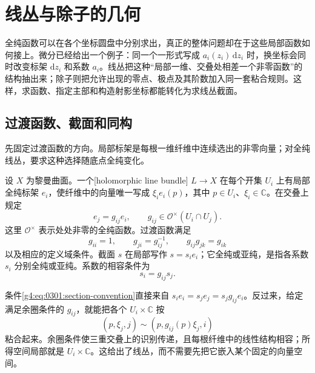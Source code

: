 
% 
% 

\section{线丛与除子的几何}
\label{g4:sec:0301}

全纯函数可以在各个坐标圆盘中分别求出，真正的整体问题却在于这些局部函数如何接上。微分已经给出一个例子：同一个一形式写成 \(a_i(z_i)\,\mathrm{d}z_i\) 时，换坐标会同时改变标架 \(\mathrm{d}z_i\) 和系数 \(a_i\)。线丛把这种“局部一维、交叠处相差一个非零函数”的结构抽出来；除子则把允许出现的零点、极点及其阶数加入同一套粘合规则。这样，求函数、指定主部和构造射影坐标都能转化为求线丛截面。

\subsection{过渡函数、截面和同构}
\label{g4:subsec:0301:01}

先固定过渡函数的方向。局部标架是每根一维纤维中连续选出的非零向量；对全纯线丛，要求这种选择随底点全纯变化。

\begin{definition}\label{g4:def:0301:line-bundle}
	设 \(X\) 为黎曼曲面。一个[holomorphic line bundle] \(L\to X\) 在每个开集 \(U_i\) 上有局部全纯标架 \(e_i\)，使纤维中的向量唯一写成 \(\xi_i e_i(p)\)，其中 \(p\in U_i\)、\(\xi_i\in\mathbb C\)。在交叠上规定
	\begin{equation}\label{g4:eq:0301:transition-convention}
		e_j=g_{ij}e_i,\qquad
		g_{ij}\in\mathcal O^\times(U_i\cap U_j).
	\end{equation}
	这里 \(\mathcal O^\times\) 表示处处非零的全纯函数。过渡函数满足
	\[
		g_{ii}=1,\qquad g_{ji}=g_{ij}^{-1},\qquad
		g_{ij}g_{jk}=g_{ik}
	\]
	以及相应的定义域条件。截面 \(s\) 在局部写作 \(s=s_i e_i\)；它全纯或亚纯，是指各系数 \(s_i\) 分别全纯或亚纯。系数的相容条件为
	\begin{equation}\label{g4:eq:0301:section-convention}
		s_i=g_{ij}s_j.
	\end{equation}
\end{definition}

条件\eqref{g4:eq:0301:section-convention}直接来自 \(s_i e_i=s_j e_j=s_jg_{ij}e_i\)。反过来，给定满足余圈条件的 \(g_{ij}\)，就能把各个 \(U_i\times\mathbb C\) 按
\[
	(p,\xi_j,j)\sim(p,g_{ij}(p)\xi_j,i)
\]
粘合起来。余圈条件使三重交叠上的识别传递，且每根纤维中的线性结构相容；所得空间局部就是 \(U_i\times\mathbb C\)。这给出了线丛，而不需要先把它嵌入某个固定的向量空间。

